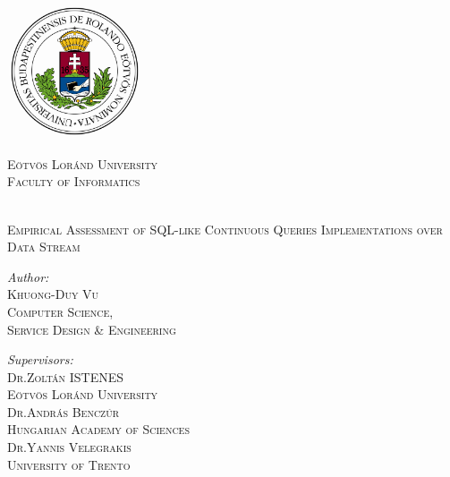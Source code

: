 
	\begin{center}
		
		\begin{minipage}{0.3\textwidth}
			\includegraphics[width=4cm]{Figs/ELTE_logo.png}
		\end{minipage} \hfill
		\begin{minipage}{0.65\textwidth}
			\begin{flushright}
				\textsc{\Large Eötvös Loránd University} \\
				\textsc{\large Faculty of Informatics}
			\end{flushright}
		\end{minipage}
		\\[3cm]
		
		{\huge \vspace{0.5cm} \textsc{Empirical Assessment of SQL-like Continuous Queries Implementations 
over Data Stream  \\[3cm] }}
		
		\begin{minipage}{0.43\textwidth}
			\begin{flushleft} \large	
				\emph{Author:}\\
				\textsc{Khuong-Duy Vu \\ \small Computer Science, \\\hspace{0cm}Service Design \& Engineering  \\\hspace{0cm}} %
			\end{flushleft}
		\end{minipage}
		\begin{minipage}{0.56\textwidth}
			\begin{flushright} \large
				\emph{Supervisors:} \\
				\textsc{Dr.Zoltán ISTENES \\ \small Eötvös Loránd University\\[0.3cm] }
				\textsc{Dr.András Benczúr \\ \small Hungarian Academy of Sciences\\[0.3cm] }
				\textsc{Dr.Yannis Velegrakis \\ \small University of Trento\\[0.3cm] }
				

\end{flushright}
\end{minipage}
\end{center}
